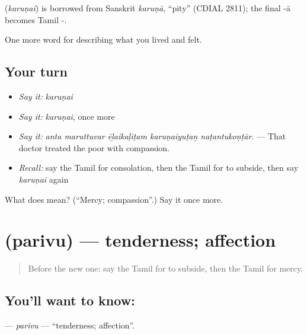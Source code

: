 \begin{cousinweb}
\textbf{} (\emph{karuṇai}) is borrowed from Sanskrit \emph{karuṇā}, \textquotedblleft{}pity\textquotedblright{} (CDIAL 2811); the final -ā becomes Tamil -.
\end{cousinweb}

\begin{grammarlens}[title={What you've built}]
One more word for describing what you lived and felt.
\end{grammarlens}

\subsection*{Your turn}
\begin{itemize}
\raggedright
  \item \emph{Say it:} \emph{karuṇai}
  \item \emph{Say it:} \emph{karuṇai}, once more
  \item \emph{Say it:} \emph{anta maruttuvar ēḻaikaḷiṭam karuṇaiyuṭaṉ naṭantukoṇṭār.} — That doctor treated the poor with compassion.
  \item \emph{Recall:} say the Tamil for consolation, then the Tamil for to subside, then say \emph{karuṇai} again
\end{itemize}

\begin{tcolorbox}[breakable,colback=teal!4,colframe=teal!35!black,title={Before you move on}]
What does  mean? (\textquotedblleft{}Mercy; compassion\textquotedblright{}.) Say it once more.
\end{tcolorbox}
\section[\texorpdfstring{\ta{பரிவு} (parivu)}{பரிவு (parivu)}]{ (parivu) — tenderness; affection}

\label{lesson:TA-C457-parivu}



\begin{quote}
Before the new one: say the Tamil for to subside, then the Tamil for mercy.
\end{quote}

\subsection*{You'll want to know: }
\textbf{} — \emph{parivu} — \textquotedblleft{}tenderness; affection\textquotedblright{}.

